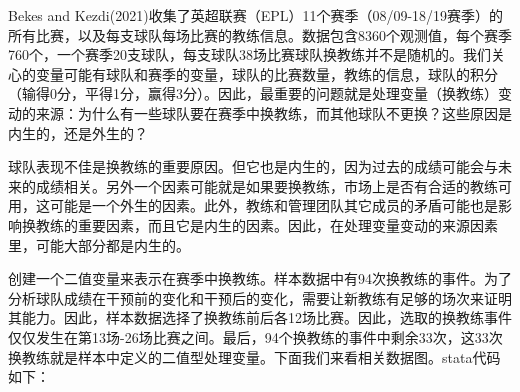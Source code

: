 \documentclass[cn,12pt,math=newtx,citestyle=gb7714-2015,bibstyle=gb7714-2015]{elegantbook}
\begin{document}
	    Bekes and Kezdi(2021)收集了英超联赛（EPL）11个赛季（08/09-18/19赛季）的所有比赛，以及每支球队每场比赛的教练信息。数据包含8360个观测值，每个赛季760个，一个赛季20支球队，每支球队38场比赛球队换教练并不是随机的。我们关心的变量可能有球队和赛季的变量，球队的比赛数量，教练的信息，球队的积分（输得0分，平得1分，赢得3分）。因此，最重要的问题就是处理变量（换教练）变动的来源：为什么有一些球队要在赛季中换教练，而其他球队不更换？这些原因是内生的，还是外生的？
	    
	    球队表现不佳是换教练的重要原因。但它也是内生的，因为过去的成绩可能会与未来的成绩相关。另外一个因素可能就是如果要换教练，市场上是否有合适的教练可用，这可能是一个外生的因素。此外，教练和管理团队其它成员的矛盾可能也是影响换教练的重要因素，而且它是内生的因素。因此，在处理变量变动的来源因素里，可能大部分都是内生的。
	    
	    创建一个二值变量来表示在赛季中换教练。样本数据中有94次换教练的事件。为了分析球队成绩在干预前的变化和干预后的变化，需要让新教练有足够的场次来证明其能力。因此，样本数据选择了换教练前后各12场比赛。因此，选取的换教练事件仅仅发生在第13场-26场比赛之间。最后，94个换教练的事件中剩余33次，这33次换教练就是样本中定义的二值型处理变量。下面我们来看相关数据图。stata代码如下：
	    
\end{document}
